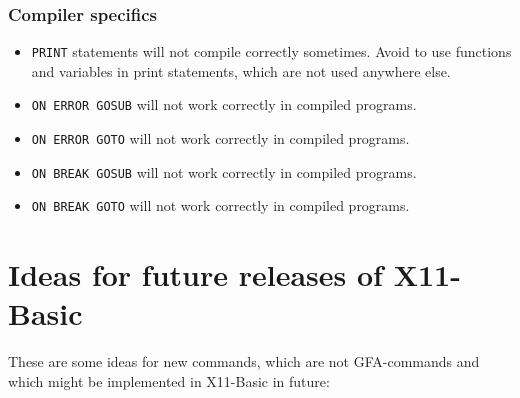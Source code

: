 \subsubsection*{Compiler specifics}

\begin{itemize}
\item \verb|PRINT| statements will not compile correctly sometimes. Avoid to use functions and variables in print statements, which are not used anywhere else. 
\item \verb|ON ERROR GOSUB| will not work correctly in compiled programs.
\item \verb|ON ERROR GOTO| will not work correctly in compiled programs.
\item \verb|ON BREAK GOSUB| will not work correctly in compiled programs.
\item \verb|ON BREAK GOTO| will not work correctly in compiled programs.
\end{itemize}

%
%

\section{Ideas for future releases of X11-Basic}

These are some ideas for new commands, which are not GFA-commands and 
which might be implemented in X11-Basic in future:

